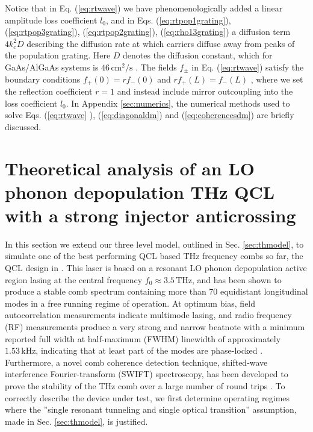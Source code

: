\documentclass[10pt,letterpaper]{article}%
\begin{document}
Notice that in Eq. (\ref{eq:rtwave}) we have phenomenologically added a linear
amplitude loss coefficient $l_{0}$, and in Eqs. (\ref{eq:rtpop1grating}),
(\ref{eq:rtpop3grating}), ({\ref{eq:rtpop2grating}), (\ref{eq:rho13grating}) a
	diffusion term $4k_{c}^{2}D$ describing the diffusion rate at which carriers
	diffuse away from peaks of the population grating. Here $D$ denotes the
	diffusion constant, which for GaAs/AlGaAs systems is }${46\,\mathrm{cm}^{2}%
	/}\mathrm{s}${ \cite{wang2009mode,vukovic2016multimode}. }
The fields $f_{\pm }$ in Eq. (\ref{eq:rtwave}) satisfy the boundary conditions
$f_{+}\left( 0\right) =rf_{-}\left( 0\right) $ and
$rf_{+}\left( L\right) =f_{-}\left( L\right) $ \cite{wang2007coherent},
where we set the reflection coefficient $r=1$ and instead include mirror outcoupling
into the loss coefficient $l_{0}$. In Appendix
\ref{sec:numerics}, the numerical methods used to solve Eqs. (\ref{eq:rtwave}%
), (\ref{eq:diagonaldm}) and (\ref{eq:coherencesdm}) are briefly discussed.


\section{Theoretical analysis of an LO phonon depopulation THz QCL with a strong injector anticrossing}
\label{sec:application}

In this section we extend our three level model, outlined in Sec. \ref{sec:thmodel}, to simulate one of the best performing QCL
based THz frequency combs so far, the QCL design in
\cite{burghoff2014terahertz}. This laser is based on a resonant LO phonon
depopulation active region lasing at the central frequency $f_{0}%
\approx3.5{\,}\mathrm{THz}$, and has been shown to produce a stable comb
spectrum containing more than 70 equidistant longitudinal modes in a free
running regime of operation. At optimum bias, field autocorrelation
measurements indicate multimode lasing, and radio frequency (RF) measurements
produce a very strong and narrow beatnote with a minimum reported full width
at half-maximum (FWHM) linewidth of approximately $1.53{\,}\mathrm{kHz}$,
indicating that at least part of the modes are phase-locked
\cite{hugi2012mid,burghoff2014terahertz,wienold2014evidence,rosch2015octave}.
Furthermore, a novel comb coherence detection technique, shifted-wave
interference Fourier-transform (SWIFT) spectroscopy, has been developed to
prove the stability of the THz comb over a large number of round trips
\cite{burghoff2015evaluating}. To correctly describe the device under test, we
first determine operating regimes where the ''single resonant tunneling and
single optical transition'' assumption, made in Sec. \ref{sec:thmodel}, is justified.
\end{document}
